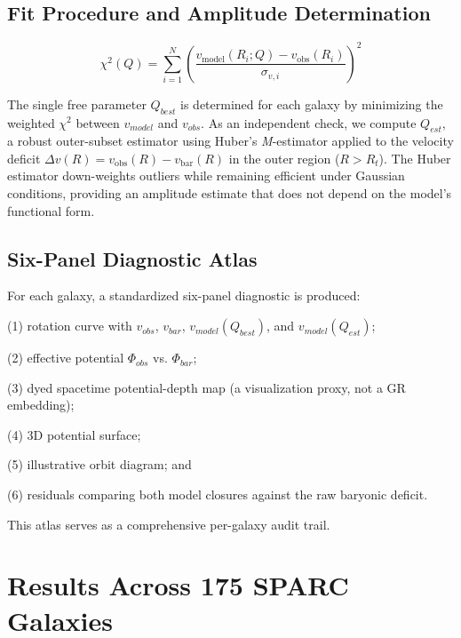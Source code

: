 \documentclass[11pt]{article}
\begin{document}
\subsection{Fit Procedure and Amplitude Determination}\label{fit-procedure-and-amplitude-determination}

\begin{equation*}
\chi^{2}(Q) = \sum_{i=1}^{N}\left( \frac{v_{\text{model}}(R_{i}; Q) - v_{\text{obs}}(R_{i})}{\sigma_{v,i}} \right)^{2}
\end{equation*}

The single free parameter \(Q_{best}\) is determined for each galaxy by minimizing the weighted \(\chi^{2}\) between \(v_{model}\) and \(v_{obs}\). As an independent check, we compute \(Q_{est}\), a robust outer-subset estimator using Huber's \emph{M}-estimator applied to the velocity deficit \(\Delta v(R) = v_{\text{obs}}(R) - v_{\text{bar}}(R)\) in the outer region (\(R > R_{t}\)). The Huber estimator down-weights outliers while remaining efficient under Gaussian conditions, providing an amplitude estimate that does not depend on the model's functional form.

\subsection{Six-Panel Diagnostic Atlas}\label{six-panel-diagnostic-atlas}

For each galaxy, a standardized six-panel diagnostic is produced:

(1) rotation curve with \(v_{obs}\), \(v_{bar}\), \(v_{model}\left( Q_{best} \right)\), and \(v_{model}\left( Q_{est} \right)\);

(2) effective potential \(\Phi_{obs}\) vs. \(\Phi_{bar}\);

(3) dyed spacetime potential-depth map (a visualization proxy, not a GR embedding);

(4) 3D potential surface;

(5) illustrative orbit diagram; and

(6) residuals comparing both model closures against the raw baryonic deficit.

This atlas serves as a comprehensive per-galaxy audit trail.


\section{Results Across 175 SPARC Galaxies}\label{results-across-175-sparc-galaxies}
\end{document}
